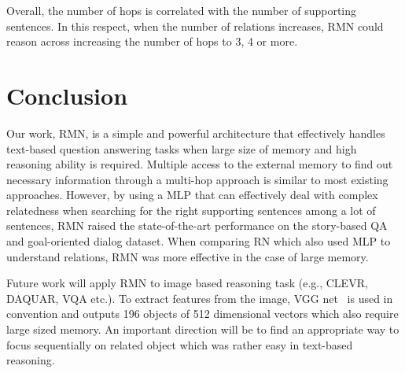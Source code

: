 \documentclass{article} \usepackage{iclr2018_conference,times}
\begin{document}
Overall, the number of hops is correlated with the number of supporting sentences.
In this respect, when the number of relations increases, RMN could reason across increasing the number of hops to 3, 4 or more.










\section{Conclusion}

Our work, RMN, is a simple and powerful architecture that effectively handles text-based question answering tasks when large size of memory and high reasoning ability is required.
Multiple access to the external memory to find out necessary information through a multi-hop approach is similar to most existing approaches.
However, by using a MLP that can effectively deal with complex relatedness when searching for the right supporting sentences among a lot of sentences, RMN raised the state-of-the-art performance on the story-based QA and goal-oriented dialog dataset.
When comparing RN which also used MLP to understand relations, RMN was more effective in the case of large memory.

Future work will apply RMN to image based reasoning task (e.g., CLEVR, DAQUAR, VQA etc.). 
To extract features from the image, VGG net~\citep{simonyan2014very} is used in convention and outputs 196 objects of 512 dimensional vectors which also require large sized memory. 
An important direction will be to find an appropriate way to focus sequentially on related object which was rather easy in text-based reasoning.
\end{document}
